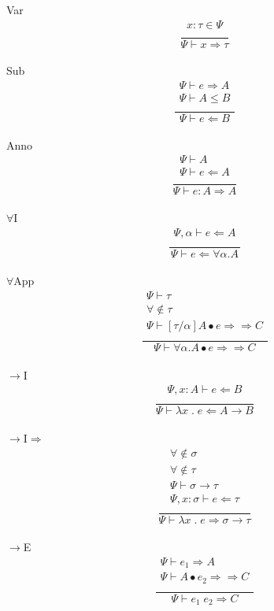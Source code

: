 \documentclass[12pt]{article}
\newcommand\eapp[2]{#1 \; #2}
\newcommand\eabs[2]{\lambda #1 \; . \; #2}
\newcommand\synth[0]{\Rightarrow \!\!\! \Rightarrow}
\begin{document}
Var \[\frac{
	\begin{array}{c}
	x : \tau \in \Psi \\
	\end{array}
}{
	\Psi \vdash x \Rightarrow \tau
}\]\\
Sub \[\frac{
	\begin{array}{c}
	\Psi \vdash e \Rightarrow A \\
	\Psi \vdash A \leq B \\
	\end{array}
}{
	\Psi \vdash e \Leftarrow B
}\]\\
Anno \[\frac{
	\begin{array}{c}
	\Psi \vdash A \\
	\Psi \vdash e \Leftarrow A \\
	\end{array}
}{
	\Psi \vdash e : A \Rightarrow A
}\]\\
$\forall$I \[\frac{
	\begin{array}{c}
	\Psi , \alpha \vdash e \Leftarrow A \\
	\end{array}
}{
	\Psi \vdash e \Leftarrow \forall \alpha . A
}\]\\
$\forall$App \[\frac{
	\begin{array}{c}
	\Psi \vdash \tau \\
	\forall \notin \tau \\
	\Psi \vdash [ \tau / \alpha ] A \bullet e \synth C \\
	\end{array}
}{
	\Psi \vdash \forall \alpha . A \bullet e \synth C
}\]\\
$\rightarrow$I \[\frac{
	\begin{array}{c}
	\Psi , x : A \vdash e \Leftarrow B \\
	\end{array}
}{
	\Psi \vdash \eabs{x}{e} \Leftarrow A \rightarrow B
}\]\\
$\rightarrow$I$\Rightarrow$ \[\frac{
	\begin{array}{c}
	\forall \notin \sigma \\
	\forall \notin \tau \\
	\Psi \vdash \sigma \rightarrow \tau \\
	\Psi , x : \sigma \vdash e \Leftarrow \tau \\
	\end{array}
}{
	\Psi \vdash \eabs{x}{e} \Rightarrow \sigma \rightarrow \tau
}\]\\
$\rightarrow$E \[\frac{
	\begin{array}{c}
	\Psi \vdash e_1 \Rightarrow A \\
	\Psi \vdash A \bullet e_2 \synth C \\
	\end{array}
}{
	\Psi \vdash \eapp{e_1}{e_2} \Rightarrow C
}\]\\
\end{document}

